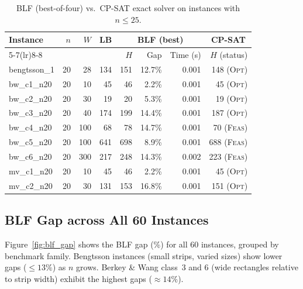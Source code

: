 \documentclass[11pt,a4paper]{article}
\begin{document}
\begin{table}[h]
\centering
\caption{BLF (best-of-four) vs.\ CP-SAT exact solver on instances with $n \le 25$.}
\label{tab:exact}
\small
\setlength{\tabcolsep}{5pt}
\begin{tabular}{lrrr rrr r}
\toprule
\multirow{2}{*}{Instance} &
\multirow{2}{*}{$n$} &
\multirow{2}{*}{$W$} &
\multirow{2}{*}{LB} &
\multicolumn{3}{c}{BLF (best)} &
\multicolumn{1}{c}{CP-SAT} \\
\cmidrule(lr){5-7}\cmidrule(lr){8-8}
& & & & $H$ & Gap & Time (s) & $H$ (status) \\
\midrule
bengtsson\_1   & 20 & 28 & 134 & 151 & 12.7\% & 0.001 & 148 (\textsc{Opt}) \\
bw\_c1\_n20    & 20 & 10 &  45 &  46 &  2.2\% & 0.001 &  45 (\textsc{Opt}) \\
bw\_c2\_n20    & 20 & 30 &  19 &  20 &  5.3\% & 0.001 &  19 (\textsc{Opt}) \\
bw\_c3\_n20    & 20 & 40 & 174 & 199 & 14.4\% & 0.001 & 187 (\textsc{Opt}) \\
bw\_c4\_n20    & 20 &100 &  68 &  78 & 14.7\% & 0.001 &  70 (\textsc{Feas}) \\
bw\_c5\_n20    & 20 &100 & 641 & 698 &  8.9\% & 0.001 & 688 (\textsc{Feas}) \\
bw\_c6\_n20    & 20 &300 & 217 & 248 & 14.3\% & 0.002 & 223 (\textsc{Feas}) \\
mv\_c1\_n20    & 20 & 10 &  45 &  46 &  2.2\% & 0.001 &  45 (\textsc{Opt}) \\
mv\_c2\_n20    & 20 & 30 & 131 & 153 & 16.8\% & 0.001 & 151 (\textsc{Opt}) \\
\bottomrule
\end{tabular}
\end{table}

\subsection{BLF Gap across All 60 Instances}

Figure~\ref{fig:blf_gap} shows the BLF gap (\%) for all 60 instances, grouped
by benchmark family.
Bengtsson instances (small strips, varied sizes) show lower gaps ($\le 13\%$)
as $n$ grows.
Berkey \& Wang class~3 and 6 (wide rectangles relative to strip width)
exhibit the highest gaps ($\approx 14\%$).
\end{document}
